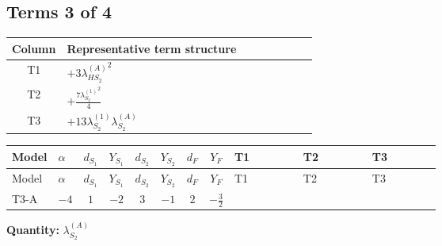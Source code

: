 \documentclass[8pt]{article}
\begin{document}
\begin{landscape}
\subsection*{Terms 3 of 4}
\begin{center}
\begin{tabular}{@{}c >{\raggedright\arraybackslash}p{0.82\linewidth}@{}}
\toprule
Column & Representative term structure \\
\midrule
T1 & \(\displaystyle +3 {\lambda_{HS_2}^{(A)}}^2\) \\
\midrule
T2 & \(\displaystyle +\frac{7 {\lambda_{S_2}^{(1)}}^2}{4}\) \\
\midrule
T3 & \(\displaystyle +13 {\lambda_{S_2}^{(1)}} {\lambda_{S_2}^{(A)}}\) \\
\midrule
\bottomrule
\end{tabular}
\end{center}
\smallskip
\tiny
\begin{longtable}{@{}llcccccc >{\raggedright\arraybackslash}p{0.21\linewidth} >{\raggedright\arraybackslash}p{0.21\linewidth} >{\raggedright\arraybackslash}p{0.21\linewidth}@{}}
\toprule
Model & $\alpha$ & $d_{S_1}$ & $Y_{S_1}$ & $d_{S_2}$ & $Y_{S_2}$ & $d_F$ & $Y_F$ & T1 & T2 & T3 \\
\midrule
\endfirsthead
\toprule
Model & $\alpha$ & $d_{S_1}$ & $Y_{S_1}$ & $d_{S_2}$ & $Y_{S_2}$ & $d_F$ & $Y_F$ & T1 & T2 & T3 \\
\midrule
\endhead
T3-A & $-4$ & $1$ & $-2$ & $3$ & $-1$ & $2$ & $-\frac{3}{2}$ & \scriptsize\adjustbox{max width=\linewidth}{$\begin{gathered} +3 {\lambda_{HS_2}^{(A)}}^2\end{gathered}$} & \scriptsize\adjustbox{max width=\linewidth}{$\begin{gathered} +\frac{7 {\lambda_{S_2}^{(1)}}^2}{4}\end{gathered}$} & \scriptsize\adjustbox{max width=\linewidth}{$\begin{gathered} +13 {\lambda_{S_2}^{(1)}} {\lambda_{S_2}^{(A)}}\end{gathered}$} \\
\midrule
\bottomrule
\end{longtable}
\clearpage
\noindent\textbf{Quantity: }$\lambda_{S_2}^{(A)}$\par\smallskip

\end{landscape}
\end{document}
